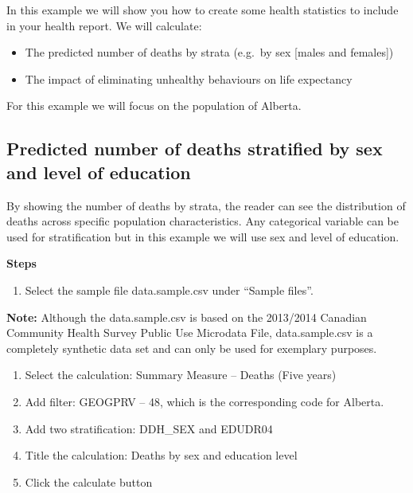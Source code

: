 \documentclass[]{book}
\providecommand{\tightlist}{%
  \setlength{\itemsep}{0pt}\setlength{\parskip}{0pt}}
\begin{document}
In this example we will show you how to create some health statistics to
include in your health report. We will calculate:

\begin{itemize}
\tightlist
\item
  The predicted number of deaths by strata (e.g.~by sex {[}males and
  females{]})
\item
  The impact of eliminating unhealthy behaviours on life expectancy
\end{itemize}

For this example we will focus on the population of Alberta.

\subsection{Predicted number of deaths stratified by sex and level of
education}\label{predicted-number-of-deaths-stratified-by-sex-and-level-of-education}

By showing the number of deaths by strata, the reader can see the
distribution of deaths across specific population characteristics. Any
categorical variable can be used for stratification but in this example
we will use sex and level of education.

\textbf{Steps}

\begin{enumerate}
\def\labelenumi{\arabic{enumi}.}
\tightlist
\item
  Select the sample file data.sample.csv under ``Sample files''.
\end{enumerate}

\textbf{Note:} Although the data.sample.csv is based on the 2013/2014
Canadian Community Health Survey Public Use Microdata File,
data.sample.csv is a completely synthetic data set and can only be used
for exemplary purposes.

\begin{enumerate}
\def\labelenumi{\arabic{enumi}.}
\setcounter{enumi}{1}
\item
  Select the calculation: Summary Measure -- Deaths (Five years)
\item
  Add filter: GEOGPRV -- 48, which is the corresponding code for
  Alberta.
\item
  Add two stratification: DDH\_SEX and EDUDR04
\item
  Title the calculation: Deaths by sex and education level
\item
  Click the calculate button
\end{enumerate}
\end{document}
